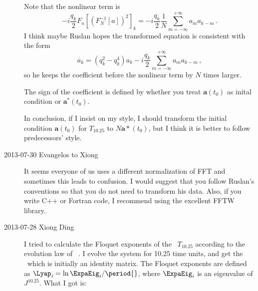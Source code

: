 \begin{description}
Note that the nonlinear term is
\[
-i\frac{q_k}{2}F_{n}[(F_N^{-1}[a])^2]_k=-i\frac{q_k}{2}\frac{1}{N}\sum_{m=-\infty}^{+\infty}a_{m}a_{k-m}
\,.
\]
I think maybe Ruslan hopes the transformed equation is consistent with the form
\[
 \dot{a_k}=(q_{k}^2-q_k^4)a_k-i\frac{q_k}{2}\sum_{m=-\infty}^{+\infty}a_{m}a_{k-m}
\,,
\]
so he keeps the coefficient before the nonlinear term by $N$ times larger.

The sign of the coefficient is defined by whether you treat $\mathbf{a}(t_0)$ as inital condition or
$\mathbf{a}^{*}(t_0)$.


In conclusion, if I insist on my style, I should transform the initial condition $\mathbf{a}(t_0)$
for $T_{10.25}$  to $N\mathbf{a}*(t_0)$, but I think it is better to follow predecessors' style.

\item[2013-07-30 Evangelos to Xiong]
It seems everyone of us uses a different normalization of FFT and sometimes this leads to
confusion. I would suggest that you follow Ruslan's conventions so that you do not need to transform
his data. Also, if you write C++ or Fortran code, I recommend using the excellent FFTW library.

\item[2013-07-28  Xiong Ding] I tried to calculate the Floquet exponents of the \po\ $T_{10.25}$
according to the evolution law of \JacobianMs\ .
I evolve the system for 10.25 time units, and get the \jacobianMs\ which is initially an identity matrix.
The Floquet exponents are defined as $\Lyap_i=\ln \ExpaEig_i /\period{}$, where $\ExpaEig_i$ is an
eigenvalue of $J^{10.25}$. What I got is:
\\


\end{description}
